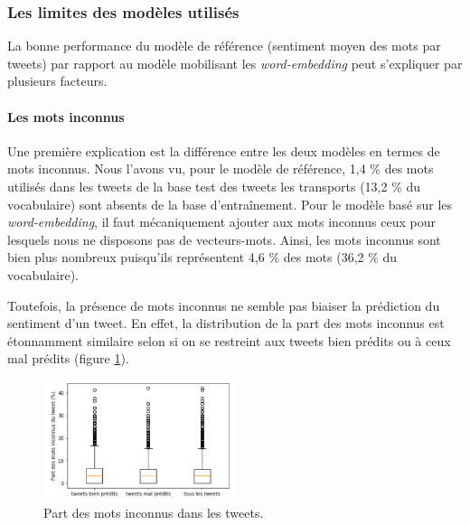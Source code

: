 \documentclass[11pt,french,french]{article}
\begin{document}
\hypertarget{les-limites-des-moduxe8les-utilisuxe9s}{%
\subsubsection{Les limites des modèles utilisés}\label{les-limites-des-moduxe8les-utilisuxe9s}}

La bonne performance du modèle de référence (sentiment moyen des mots par tweets) par rapport au modèle mobilisant les \emph{word-embedding} peut s'expliquer par plusieurs facteurs.

\hypertarget{les-mots-inconnus}{%
\paragraph{Les mots inconnus}\label{les-mots-inconnus}}

Une première explication est la différence entre les deux modèles en termes de mots inconnus.
Nous l'avons vu, pour le modèle de référence, 1,4 \% des mots utilisés dans les tweets de la base test des tweets les transports (13,2 \% du vocabulaire) sont absents de la base d'entraînement.
Pour le modèle basé sur les \emph{word-embedding}, il faut mécaniquement ajouter aux mots inconnus ceux pour lesquels nous ne disposons pas de vecteurs-mots.
Ainsi, les mots inconnus sont bien plus nombreux puisqu'ils représentent 4,6 \% des mots (36,2 \% du vocabulaire).

Toutefois, la présence de mots inconnus ne semble pas biaiser la prédiction du sentiment d'un tweet.
En effet, la distribution de la part des mots inconnus est étonnamment similaire selon si on se restreint aux tweets bien prédits ou à ceux mal prédits (figure \ref{fig:mots_inconnus}).

\begin{figure}[ht]
\begin{center}
\includegraphics[width=0.5\textwidth]{img/mots_inconnus.png}
\captionsetup{margin=0cm,format=hang,justification=justified}
\caption{Part des mots inconnus dans les tweets.}\label{fig:mots_inconnus}
\end{center}
\end{figure}
\end{document}

